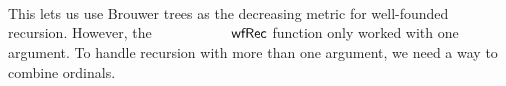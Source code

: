\begin{code}
\AgdaSpace{}%
\AgdaSpace{}%
\AgdaSymbol{)}\<%
\\
\>[8][@{}l@{\AgdaIndent{0}}]%
\>[10]\AgdaSymbol{=}%
\>[605I]\AgdaSpace{}%
\AgdaSymbol{(}\AgdaSpace{}%
\AgdaSymbol{)}\<%
\\
\>[.][@{}l@{}]\<[605I]%
\>[12]\AgdaSymbol{(}\AgdaSpace{}%
\AgdaSymbol{(}\AgdaSpace{}%
\AgdaSymbol{))}\AgdaSpace{}%
\AgdaSpace{}%
\AgdaSymbol{(}\AgdaSpace{}%
\AgdaSymbol{)}\<%
\\
\>[0]\<%
\end{code}
This lets us use Brouwer trees as the decreasing metric for well-founded recursion.
However, the $\AgdaFunction{wfRec}$ function only worked with one argument.
To handle recursion with more than one argument, we need a way to combine ordinals.
